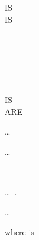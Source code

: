 \begin{syntax}
   \reportname

  \begin{0-1}
    IS  \\

     IS
    \begin{1=}
      \identifier \\
      \literal
    \end{1=} \\

    \begin{1=}
       \\
    \end{1=}
    \begin{0-1}
      IS \\
      ARE
    \end{0-1}
    \begin{1=}
      \begin{1=}
        \identifier
      \end{1=}\ldots \\
      
      \begin{0-1}
        \identifier
      \end{0-1}\ldots \\
    \end{1=} \\

  \end{0-1}\ldots\ {}.\newline

  \begin{1=}
  \end{1=}\ldots
\end{syntax}

where  is

